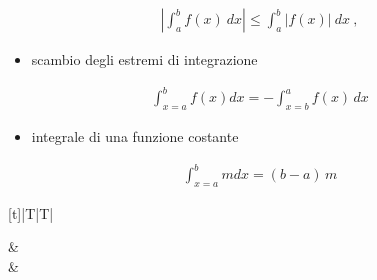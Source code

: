 \documentclass[letterpaper,10pt,italian]{jupyterBook}
\begin{document}
\begin{equation}\label{equation:ch/infinitesimal_calculus/integrals:infinitesimal-calculus:integrals:prop:abs}
\begin{split}\left| \int_a^b f(x) \ dx \right| \le \int_a^b | f(x) | \ dx \ ,\end{split}
\end{equation}\begin{itemize}
\item {} 
\sphinxAtStartPar
scambio degli estremi di integrazione

\end{itemize}
\begin{equation}\label{equation:ch/infinitesimal_calculus/integrals:infinitesimal-calculus:integrals:prop:swap}
\begin{split}\int_{x=a}^{b} f(x) dx = - \int_{x=b}^{a} f(x) \, dx\end{split}
\end{equation}\begin{itemize}
\item {} 
\sphinxAtStartPar
integrale di una funzione costante

\end{itemize}
\begin{equation}\label{equation:ch/infinitesimal_calculus/integrals:infinitesimal-calculus:integrals:prop:const}
\begin{split}\int_{x=a}^{b} m dx = (b-a) \, m \end{split}
\end{equation}

\begin{savenotes}\sphinxattablestart
\centering
\begin{tabulary}{\linewidth}[t]{|T|T|}
\hline

\sphinxAtStartPar
{}
&
\sphinxAtStartPar
{}
\\
\hline
\sphinxAtStartPar
{}
&
\sphinxAtStartPar
{}
\\
\hline
\end{tabulary}
\par
\sphinxattableend\end{savenotes}
\end{document}
